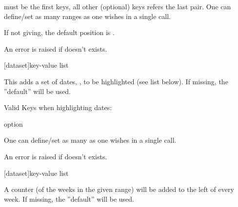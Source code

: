 \documentclass{article}
\begin{document}
\begin{tsremark}
 must be the first keys, all other (optional) keys refers the last  pair. One can define/set as many  ranges as one wishes in a single \tsobj{\setranges} call.
\end{tsremark}

\begin{tsremark}
If not giving, the default position is .
\end{tsremark}

\begin{tsremark}
An error is raised if  doesn't exists.
\end{tsremark}


\begin{codedescribe}{\sethighlightdates}
\begin{codesyntax}%
\tsmacro{\sethighlightdates}[dataset]{key-value list}
\end{codesyntax}
This adds a set of dates, , to be highlighted  (see list below). If missing, the ''default''  will be used.
\end{codedescribe}


{Valid Keys when highlighting dates:}
\begin{describelist*}{option}
\end{describelist*}

\begin{tsremark}
One can define/set as many  as one wishes in a single \tsobj{\sethighlightdates} call.
\end{tsremark}

\begin{tsremark}
An error is raised if  doesn't exists.
\end{tsremark}


\begin{codedescribe}{\setcountingweeks}
\begin{codesyntax}%
\tsmacro{\setcountingweeks}[dataset]{key-value list}
\end{codesyntax}
A counter (of the weeks in the given range)  will be added to the left of every week. If missing, the ''default''  will be used.
\end{codedescribe}
\end{document}
